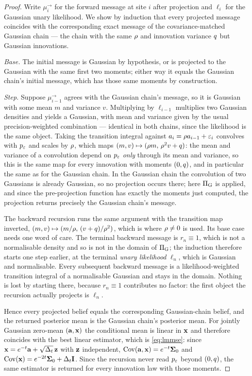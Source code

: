 \begin{proof}
Write $\mu_i^{\rightarrow}$ for the forward message at site $i$ after projection and
$\ell_i$ for the Gaussian unary likelihood. We show by induction that every projected message
coincides with the corresponding exact message of the covariance-matched Gaussian chain --- the
chain with the same $\rho$ and innovation variance $q$ but Gaussian innovations.

\emph{Base.} The initial message is Gaussian by hypothesis, or is projected to the Gaussian with
the same first two moments; either way it equals the Gaussian chain's initial message, which has
those same moments by construction.

\emph{Step.} Suppose $\mu_{i-1}^{\rightarrow}$ agrees with the Gaussian chain's message, so it is
Gaussian with some mean $m$ and variance $v$. Multiplying by $\ell_{i-1}$ multiplies two Gaussian
densities and yields a Gaussian, with mean and variance given by the usual precision-weighted
combination --- identical in both chains, since the likelihood is the same object. Taking the
transition integral against $a_i = \rho a_{i-1} + \varepsilon_i$ convolves with $p_{\varepsilon}$ and
scales by $\rho$, which maps $(m,v) \mapsto (\rho m,\, \rho^2 v + q)$: the mean and variance
of a convolution depend on $p_{\varepsilon}$ \emph{only} through its mean and variance, so this is the same
map for every innovation with moments $(0,q)$, and in particular the same as for the Gaussian
chain. In the Gaussian chain the convolution of two Gaussians is already Gaussian, so no
projection occurs there; here $\Pi_{\mathrm{G}}$ is applied, and since the pre-projection function has
exactly the moments just computed, the projection returns precisely the Gaussian chain's message.

The backward recursion runs the same argument with the transition map inverted, $(m,v)\mapsto
(m/\rho,\,(v+q)/\rho^2)$, which is where $\rho\neq0$ is used. Its base case needs one word
of care. The terminal backward message is $r_n\equiv 1$, which is not a normalisable density and
so is not in the domain of $\Pi_{\mathrm{G}}$; the induction therefore starts one step earlier, at the
terminal \emph{unary likelihood} $\ell_n$, which is Gaussian and normalisable. Every subsequent
backward message is a likelihood-weighted transition integral of a normalisable Gaussian and stays
in the domain. Nothing is lost by starting there, because $r_n\equiv1$ contributes no factor: the
first object the recursion actually projects is $\ell_n$.

Hence every projected belief equals the corresponding Gaussian-chain belief, and the returned
posterior mean is the Gaussian chain's posterior mean. For jointly Gaussian zero-mean
$(\mathbf{a},\mathbf{x})$ the conditional mean is linear in $\mathbf{x}$ and therefore coincides with the best linear
estimator, which is \eqref{eq:lmmse}: since $\mathbf{x} = e^{-t}\mathbf{a} + \sqrt{\Delta_t}\,\mathbf{z}$ with
$\mathbf{z}$ independent, $\operatorname{Cov}(\mathbf{a},\mathbf{x})=e^{-t}\mathbf{\Sigma}_0$ and $\operatorname{Cov}(\mathbf{x})=e^{-2t}\mathbf{\Sigma}_0+\Delta_t\mathbf{I}$. Since
the recursion never read $p_{\varepsilon}$ beyond $(0,q)$, the same estimator is returned for every
innovation law with those moments.
\end{proof}
